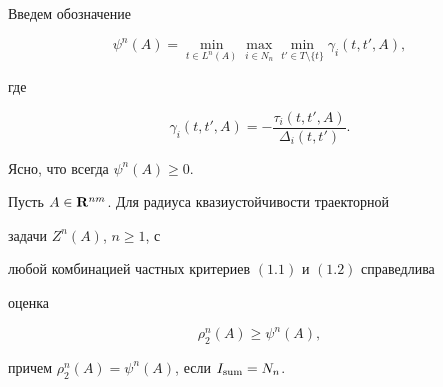  


Введем обозначение 


\begin{equation} 


\psi^n(A)=\min_{t\in L^n(A)}\max_{i\in N_n} 


\min_{t'\in T\setminus\{t\}}\gamma_i(t,t',A), 


\end{equation} 


где 


\begin{equation} 


\gamma_i(t,t',A)=-\frac{\tau_i(t,t',A)}{\Delta_i(t,t')}. 


\end{equation} 


Ясно, что всегда $\psi^n(A)\ge 0$. 


 


\begin{thms} 


Пусть $A\in\bold R^{nm}$. Для радиуса квазиустойчивости траекторной 


задачи $Z^n(A)$, $n\ge 1$, с 


любой комбинацией частных критериев $(1.1)$ и $(1.2)$ справедлива 


оценка 


\begin{equation} 


\rho^n_2(A)\ge\psi^n(A), 


\end{equation} 


причем $\rho^n_2(A)=\psi^n(A)$, если $I_{\operatorname{sum}}=N_n$. 


\end{thms} 


 


